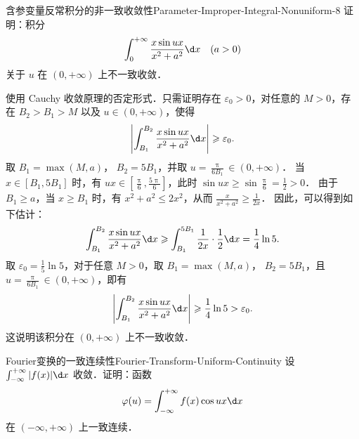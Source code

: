 \begin{problem}{含参变量反常积分的非一致收敛性}{Parameter-Improper-Integral-Nonuniform-8}
    证明：积分
    \begin{equation}\label{eq:q8-integral-1}
        \int_0^{+\infty} \frac{x \sin ux}{x^2 + a^2} \d x \quad (a > 0)
    \end{equation}
    关于 $u$ 在 $(0, +\infty)$ 上不一致收敛．
\end{problem}

\begin{myproof}
    使用 Cauchy 收敛原理的否定形式．只需证明存在 $\varepsilon_0 > 0$，对任意的 $M > 0$，存在 $B_2 > B_1 > M$ 以及 $u \in (0, +\infty)$，使得
    \begin{equation}\label{eq:q8-cauchy-neg-2}
        \left| \int_{B_1}^{B_2} \frac{x \sin ux}{x^2 + a^2} \d x \right| \geqslant \varepsilon_0.
    \end{equation}
    取 $B_1 = \max(M, a)$， $B_2 = 5 B_1$，并取 $u = \frac{\uppi}{6 B_1} \in (0, +\infty)$．
    当 $x \in [B_1, 5 B_1]$ 时，有 $ux \in [\frac{\uppi}{6}, \frac{5\uppi}{6}]$，此时 $\sin ux \geqslant \sin \frac{\uppi}{6} = \frac{1}{2} > 0$．
    由于 $B_1 \geqslant a$，当 $x \geqslant B_1$ 时，有 $x^2 + a^2 \leqslant 2x^2$，从而 $\frac{x}{x^2 + a^2} \geqslant \frac{1}{2x}$．
    因此，可以得到如下估计：
    \begin{equation}\label{eq:q8-estimate-3}
        \int_{B_1}^{B_2} \frac{x \sin ux}{x^2 + a^2} \d x \geqslant \int_{B_1}^{5 B_1} \frac{1}{2x} \cdot \frac{1}{2} \d x = \frac{1}{4} \ln 5.
    \end{equation}
    取 $\varepsilon_0 = \frac{1}{5} \ln 5$，对于任意 $M > 0$，取 $B_1 = \max(M, a)$， $B_2 = 5 B_1$，且 $u = \frac{\uppi}{6 B_1} \in (0, +\infty)$，即有
    \begin{equation}\label{eq:q8-conclusion-4}
        \left| \int_{B_1}^{B_2} \frac{x \sin ux}{x^2 + a^2} \d x \right| \geqslant \frac{1}{4} \ln 5 > \varepsilon_0.
    \end{equation}
    这说明该积分在 $(0, +\infty)$ 上不一致收敛．
\end{myproof}

\begin{problem}{Fourier变换的一致连续性}{Fourier-Transform-Uniform-Continuity}
    设 $\int_{-\infty}^{+\infty} |f(x)| \d x$ 收敛．证明：函数
    \begin{equation}\label{eq:q9-def-1}
        \varphi(u) = \int_{-\infty}^{+\infty} f(x) \cos ux \d x
    \end{equation}
    在 $(-\infty, +\infty)$ 上一致连续．
\end{problem}

